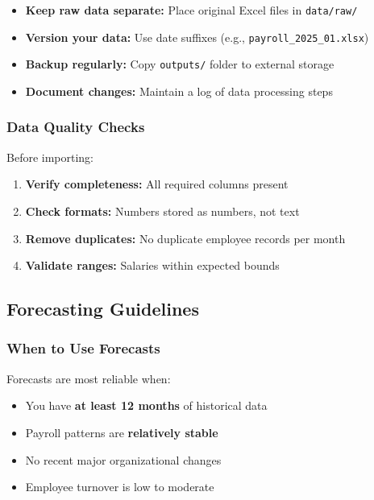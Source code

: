 \documentclass[11pt,a4paper]{article}
\begin{document}
\begin{itemize}[leftmargin=*]
    \item \textbf{Keep raw data separate:} Place original Excel files in \texttt{data/raw/}
    \item \textbf{Version your data:} Use date suffixes (e.g., \texttt{payroll\_2025\_01.xlsx})
    \item \textbf{Backup regularly:} Copy \texttt{outputs/} folder to external storage
    \item \textbf{Document changes:} Maintain a log of data processing steps
\end{itemize}

\subsubsection{Data Quality Checks}

Before importing:
\begin{enumerate}[leftmargin=*]
    \item \textbf{Verify completeness:} All required columns present
    \item \textbf{Check formats:} Numbers stored as numbers, not text
    \item \textbf{Remove duplicates:} No duplicate employee records per month
    \item \textbf{Validate ranges:} Salaries within expected bounds
\end{enumerate}

\subsection{Forecasting Guidelines}

\subsubsection{When to Use Forecasts}

Forecasts are most reliable when:
\begin{itemize}[leftmargin=*]
    \item You have \textbf{at least 12 months} of historical data
    \item Payroll patterns are \textbf{relatively stable}
    \item No recent major organizational changes
    \item Employee turnover is low to moderate
\end{itemize}
\end{document}

